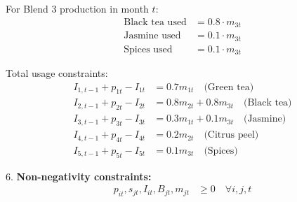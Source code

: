 \documentclass[11pt]{article}
\begin{document}
\begin{enumerate}
    For Blend 3 production in month $t$:
    \begin{align*}
    \text{Black tea used} &= 0.8 \cdot m_{3t} \\
    \text{Jasmine used} &= 0.1 \cdot m_{3t} \\
    \text{Spices used} &= 0.1 \cdot m_{3t}
    \end{align*}
    
    Total usage constraints:
    \begin{align*}
    I_{1,t-1} + p_{1t} - I_{1t} &= 0.7m_{1t} \quad \text{(Green tea)} \\
    I_{2,t-1} + p_{2t} - I_{2t} &= 0.8m_{2t} + 0.8m_{3t} \quad \text{(Black tea)} \\
    I_{3,t-1} + p_{3t} - I_{3t} &= 0.3m_{1t} + 0.1m_{3t} \quad \text{(Jasmine)} \\
    I_{4,t-1} + p_{4t} - I_{4t} &= 0.2m_{2t} \quad \text{(Citrus peel)} \\
    I_{5,t-1} + p_{5t} - I_{5t} &= 0.1m_{3t} \quad \text{(Spices)}
    \end{align*}
    
    6. \textbf{Non-negativity constraints:}
    \begin{align*}
    p_{it}, s_{jt}, I_{it}, B_{jt}, m_{jt} &\ge 0 \quad \forall i,j,t
    \end{align*}

\end{enumerate}
\end{document}
